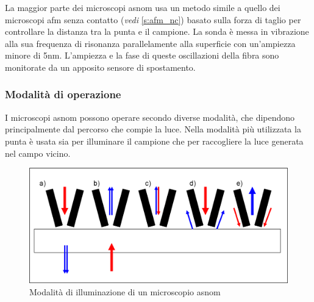 \documentclass[../main.tex]{subfiles}
\begin{document}
La maggior parte dei microscopi \acrshort{asnom} usa un metodo simile a quello dei microscopi \acrshort{afm} senza contatto (\textit{vedi} \ref{s:afm_nc}) basato sulla forza di taglio per controllare la distanza tra la punta e il campione. La sonda è messa in vibrazione alla sua frequenza di risonanza parallelamente alla superficie con un'ampiezza minore di 5nm. L'ampiezza e la fase di queste oscillazioni della fibra sono monitorate da un apposito sensore di spostamento.\cite{hecht_2000}

\subsubsection{Modalità di operazione}

I microscopi \acrshort{asnom} possono operare secondo diverse modalità, che dipendono principalmente dal percorso che compie la luce. Nella modalità più utilizzata la punta è usata sia per illuminare il campione che per raccogliere la luce generata nel campo vicino.\cite{alvarez_2006}\\

\begin{figure}[h]
	\includegraphics[keepaspectratio, width=\linewidth]{images/snom_apertures.png}
	\caption[Modalità di illuminazione di un microscopio a-SNOM]{
		Modalità di illuminazione di un microscopio \acrshort{asnom}}
	\label{fig:snom_apertures}
\end{figure}
\end{document}
